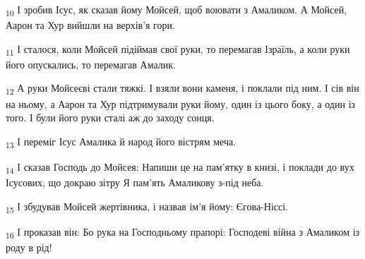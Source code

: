 \begin{tcolorbox}
\textsubscript{10} І зробив Ісус, як сказав йому Мойсей, щоб воювати з Амаликом. А Мойсей, Аарон та Хур вийшли на верхів'я гори.
\end{tcolorbox}
\begin{tcolorbox}
\textsubscript{11} І сталося, коли Мойсей підіймав свої руки, то перемагав Ізраїль, а коли руки його опускались, то перемагав Амалик.
\end{tcolorbox}
\begin{tcolorbox}
\textsubscript{12} А руки Мойсеєві стали тяжкі. І взяли вони каменя, і поклали під ним. І сів він на ньому, а Аарон та Хур підтримували руки йому, один із цього боку, а один із того. І були його руки сталі аж до заходу сонця.
\end{tcolorbox}
\begin{tcolorbox}
\textsubscript{13} І переміг Ісус Амалика й народ його вістрям меча.
\end{tcolorbox}
\begin{tcolorbox}
\textsubscript{14} І сказав Господь до Мойсея: Напиши це на пам'ятку в книзі, і поклади до вух Ісусових, що докраю зітру Я пам'ять Амаликову з-під неба.
\end{tcolorbox}
\begin{tcolorbox}
\textsubscript{15} І збудував Мойсей жертівника, і назвав ім'я йому: Єгова-Ніссі.
\end{tcolorbox}
\begin{tcolorbox}
\textsubscript{16} І проказав він: Бо рука на Господньому прапорі: Господеві війна з Амаликом із роду в рід!
\end{tcolorbox}

